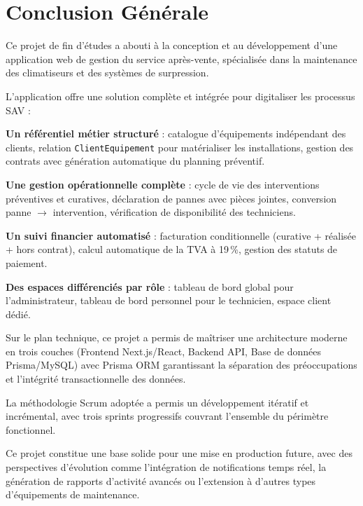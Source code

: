 \newpage
\pagestyle{fancy}
\renewcommand{\headrulewidth}{0.5pt}
\renewcommand{\footrulewidth}{0.5pt}
\chapter*{Conclusion Générale}
\mtcaddchapter

Ce projet de fin d'études a abouti à la conception et au développement d'une application web de
gestion du service après-vente, spécialisée dans la maintenance des climatiseurs et des systèmes
de surpression.

L'application offre une solution complète et intégrée pour digitaliser les processus SAV :

\textbf{Un référentiel métier structuré} : catalogue d'équipements indépendant des clients,
relation \texttt{ClientEquipement} pour matérialiser les installations, gestion des contrats avec
génération automatique du planning préventif.

\textbf{Une gestion opérationnelle complète} : cycle de vie des interventions préventives et
curatives, déclaration de pannes avec pièces jointes, conversion panne $\rightarrow$ intervention,
vérification de disponibilité des techniciens.

\textbf{Un suivi financier automatisé} : facturation conditionnelle (curative + réalisée + hors
contrat), calcul automatique de la TVA à 19\,\%, gestion des statuts de paiement.

\textbf{Des espaces différenciés par rôle} : tableau de bord global pour l'administrateur, tableau
de bord personnel pour le technicien, espace client dédié.

Sur le plan technique, ce projet a permis de maîtriser une architecture moderne en trois couches
(Frontend Next.js/React, Backend API, Base de données Prisma/MySQL) avec Prisma ORM garantissant
la séparation des préoccupations et l'intégrité transactionnelle des données.

La méthodologie Scrum adoptée a permis un développement itératif et incrémental, avec trois sprints
progressifs couvrant l'ensemble du périmètre fonctionnel.

Ce projet constitue une base solide pour une mise en production future, avec des perspectives
d'évolution comme l'intégration de notifications temps réel, la génération de rapports d'activité
avancés ou l'extension à d'autres types d'équipements de maintenance.
